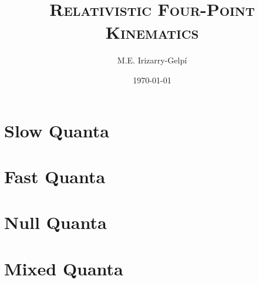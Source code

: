 \documentclass[legalpaper, 12pt]{report}
\begin{document}
\title{\Huge\textsc{Relativistic Four-Point Kinematics}}
\author{M.E. Irizarry-Gelp\'{i}}
\date{\today}

\maketitle
\tableofcontents



\part{Slow Quanta}



\part{Fast Quanta}



\part{Null Quanta}

\part{Mixed Quanta}





\end{document}
